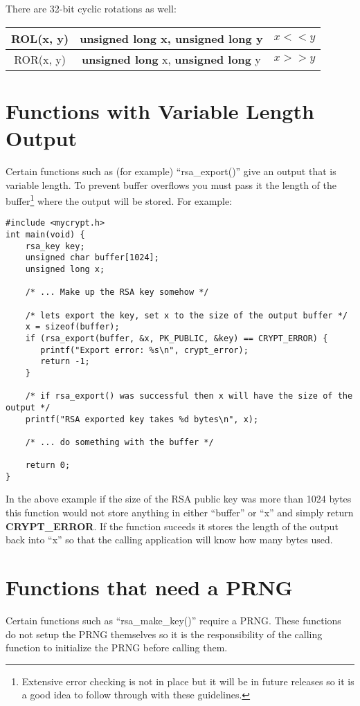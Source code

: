 \documentclass{book}
\begin{document}
There are 32-bit cyclic rotations as well:
 
\begin{center}
\begin{tabular}{|c|c|c|}
     \hline ROL(x, y) & {\bf unsigned long} x, {\bf unsigned long} y & $x << y$ \\
     \hline ROR(x, y) & {\bf unsigned long} x, {\bf unsigned long} y & $x >> y$ \\
     \hline
\end{tabular}
\end{center}

\section{Functions with Variable Length Output}
Certain functions such as (for example) ``rsa\_export()'' give an output that is variable length.  To prevent buffer overflows you
must pass it the length of the buffer\footnote{Extensive error checking is not in place but it will be in future releases so it is a good idea to follow through with these guidelines.} where
the output will be stored.  For example:
\begin{small}
\begin{verbatim}
#include <mycrypt.h>
int main(void) {
    rsa_key key;
    unsigned char buffer[1024];
    unsigned long x;

    /* ... Make up the RSA key somehow */

    /* lets export the key, set x to the size of the output buffer */
    x = sizeof(buffer);
    if (rsa_export(buffer, &x, PK_PUBLIC, &key) == CRYPT_ERROR) {
       printf("Export error: %s\n", crypt_error);
       return -1;
    }
    
    /* if rsa_export() was successful then x will have the size of the output */
    printf("RSA exported key takes %d bytes\n", x);

    /* ... do something with the buffer */

    return 0;
}
\end{verbatim}
\end{small}
In the above example if the size of the RSA public key was more than 1024 bytes this function would not store anything in
either ``buffer'' or ``x'' and simply return {\bf CRYPT\_ERROR}.  If the function suceeds it stores the length of the output
back into ``x'' so that the calling application will know how many bytes used.

\section{Functions that need a PRNG}
Certain functions such as ``rsa\_make\_key()'' require a PRNG.  These functions do not setup the PRNG themselves so it is 
the responsibility of the calling function to initialize the PRNG before calling them.
\end{document}
